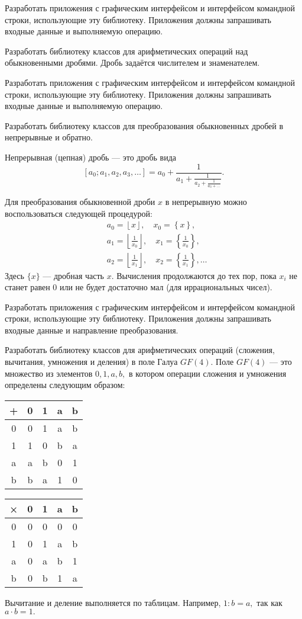 Разработать приложения с графическим интерфейсом и интерфейсом
командной строки, использующие эту библиотеку. Приложения должны
запрашивать входные данные и выполняемую операцию.

\task Разработать библиотеку классов для арифметических операций над
обыкновенными дробями. Дробь задаётся числителем и знаменателем.

Разработать приложения с графическим интерфейсом и интерфейсом
командной строки, использующие эту библиотеку. Приложения должны
запрашивать входные данные и выполняемую операцию.

\task Разработать библиотеку классов для преобразования обыкновенных
дробей в непрерывные и обратно.

Непрерывная (цепная) дробь — это дробь вида
\[
[a_0; a_1, a_2, a_3, \dots] = a_0 + \frac1{a_1 + \frac1{a_2 + \frac1{a_3 + \dots}}}.
\]

Для преобразования обыкновенной дроби $x$ в непрерывную можно
воспользоваться следующей процедурой:
\begin{align*}
&a_0 = \left\lfloor x \right\rfloor,\quad x_0 = \left\{x\right\},\\
&a_1 = \left\lfloor \frac1{x_0} \right\rfloor,\quad x_1 = \left\{\frac1{x_0}\right\},\\
&a_2 = \left\lfloor \frac1{x_1} \right\rfloor,\quad x_2 = \left\{\frac1{x_1}\right\}, \dots
\end{align*}
Здесь $\{x\}$ — дробная часть $x$. Вычисления продолжаются до тех пор,
пока $x_i$ не станет равен $0$ или не будет достаточно мал (для
иррациональных чисел).

Разработать приложения с графическим интерфейсом и интерфейсом
командной строки, использующие эту библиотеку. Приложения должны
запрашивать входные данные и направление преобразования.

\task Разработать библиотеку классов для арифметических операций
(сложения, вычитания, умножения и деления) в поле Галуа $GF(4)$. Поле
$GF(4)$ — это множество из элементов ${0, 1, a, b},$ в котором
операции сложения и умножения определены следующим образом:

\begin{table}
  \parbox{.45\linewidth}{
    \centering
    \begin{tabular}{c|cccc}
      +&0&1&a&b\\
      \hline
      0&0&1&a&b\\
      1&1&0&b&a\\
      a&a&b&0&1\\
      b&b&a&1&0
    \end{tabular}
  }
  \hfill
  \parbox{.45\linewidth}{
    \centering
    \begin{tabular}{c|cccc}
      ×&0&1&a&b\\
      \hline
      0&0&0&0&0\\
      1&0&1&a&b\\
      a&0&a&b&1\\
      b&0&b&1&a
    \end{tabular}
  }
\end{table}
Вычитание и деление выполняется по таблицам. Например, $1:b = a,$ так
как $a\cdot b=1.$

